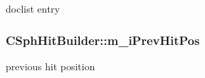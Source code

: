 doclist entry 

\hypertarget{classCSphHitBuilder_af58f603397e11110becbdd058312572d}{
\subsubsection[{m\-\_\-i\-Prev\-Hit\-Pos}]{ C\-Sph\-Hit\-Builder\-::m\-\_\-i\-Prev\-Hit\-Pos\hspace{0.3cm}{\ttfamily [private]}}}\label{classCSphHitBuilder_af58f603397e11110becbdd058312572d}


previous hit position 

